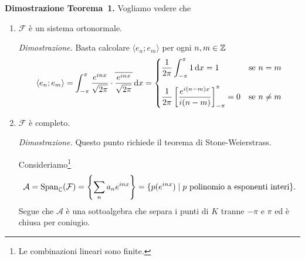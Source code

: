 \textbf{Dimostrazione Teorema~1.}
Vogliamo vedere che
\begin{enumerate}
	\item $\mathcal F$ è un sistema ortonormale.

		\textit{Dimostrazione.}
		Basta calcolare $\langle e_n; e_m \rangle$ per ogni $n, m \in \mathbb Z$
		$$
		\langle e_n; e_m \rangle
		= \int_{-\pi}^\pi \frac{e^{inx}}{\sqrt{2\pi}} \cdot \overline{\frac{e^{inx}}{\sqrt{2\pi}}} \,\mathrm{d} x
		=
		\begin{cases}
			\displaystyle \frac{1}{2\pi} \int_{-\pi}^\pi 1 \,\mathrm{d} x = 1 & \text{se } n = m \\[15pt]
			\displaystyle \frac{1}{2\pi} \left[ \frac{e^{i(n - m)x}}{i(n - m)} \right]_{-\pi}^\pi = 0& \text{se } n \neq m \\
		\end{cases}
		$$

	\item $\mathcal F$ è completo.

		\textit{Dimostrazione.} Questo punto richiede il teorema di Stone-Weierstrass.

		Consideriamo\footnote{Le combinazioni lineari sono finite.}
		$$
			\mathcal A = \operatorname{Span}_\mathbb C(\mathcal F) = \left\{ \sum_n a_n e^{inx} \right\} = \{ p(e^{inx}) \mid p \text{ polinomio a esponenti interi} \}.
		$$
		Segue che $\mathcal A$ è una sottoalgebra che separa i punti di $K$ tranne $-\pi$ e $\pi$ ed è chiusa per coniugio.





\end{enumerate}
